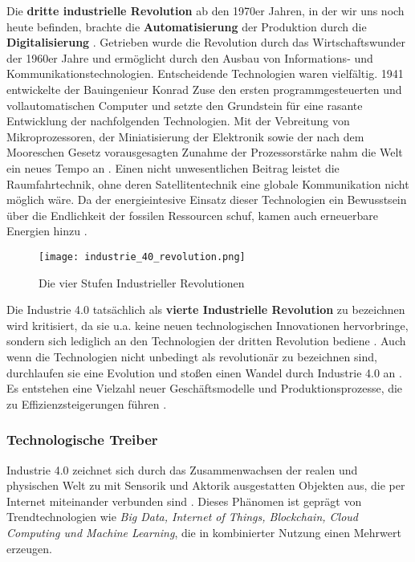 Die \textbf{dritte industrielle Revolution} ab den 1970er Jahren, in der wir uns noch heute befinden,  brachte die \textbf{Automatisierung} der Produktion durch die \textbf{Digitalisierung} \citep{Voigt2018}. Getrieben wurde die Revolution durch das Wirtschaftswunder der 1960er Jahre \citep{Roth2016} und ermöglicht durch den Ausbau von Informations- und Kommunikationstechnologien. Entscheidende Technologien waren vielfältig. 1941 entwickelte der Bauingenieur Konrad Zuse den ersten programmgesteuerten und vollautomatischen Computer und setzte den Grundstein für eine rasante Entwicklung der nachfolgenden Technologien. Mit der Vebreitung von Mikroprozessoren, der Miniatisierung der Elektronik sowie der nach dem Mooreschen Gesetz vorausgesagten Zunahme der Prozessorstärke nahm die Welt ein neues Tempo an \citep{Sendler2016}. Einen nicht unwesentlichen Beitrag leistet die Raumfahrtechnik, ohne deren Satellitentechnik eine globale Kommunikation nicht möglich wäre. Da der energieintesive Einsatz dieser Technologien ein Bewusstsein über die Endlichkeit der fossilen Ressourcen schuf, kamen auch erneuerbare Energien hinzu \citep{Barthelmaes2017}.

\begin{figure}[ht]
  \centering
  \texttt{[image: industrie\_40\_revolution.png]}
  \caption[Die vier Stufen Industrieller Revolutionen]{Die vier Stufen Industrieller Revolutionen\citep{Bauer2015}}
  \label{fig:revolutions}
\end{figure}


Die Industrie 4.0 tatsächlich als \textbf{vierte Industrielle Revolution} zu bezeichnen wird kritisiert, da sie u.a. keine neuen technologischen Innovationen hervorbringe, sondern sich lediglich an den Technologien der dritten Revolution bediene \citep{Barthelmaes2017}. Auch wenn die Technologien nicht unbedingt als revolutionär zu bezeichnen sind, durchlaufen sie eine Evolution und stoßen einen Wandel durch Industrie 4.0 an \citep{Roth2016}. Es entstehen eine Vielzahl neuer Geschäftsmodelle und Produktionsprozesse, die zu Effizienzsteigerungen führen \citep{BITKOM2015}.


\subsubsection{Technologische Treiber}

Industrie 4.0 zeichnet sich durch das Zusammenwachsen der realen und physischen Welt zu mit Sensorik und Aktorik ausgestatten Objekten aus, die per Internet miteinander verbunden sind \citep{BITKOM2015}. Dieses Phänomen ist geprägt von Trendtechnologien wie \textit{Big Data, Internet of Things, Blockchain, Cloud Computing und Machine Learning}, die in kombinierter Nutzung einen Mehrwert erzeugen.

